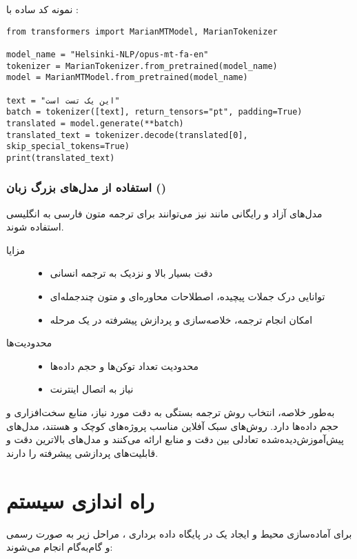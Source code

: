 \documentclass{article}
\begin{document}
نمونه کد ساده با :
\begin{latin}
\begin{lstlisting}
from transformers import MarianMTModel, MarianTokenizer

model_name = "Helsinki-NLP/opus-mt-fa-en"
tokenizer = MarianTokenizer.from_pretrained(model_name)
model = MarianMTModel.from_pretrained(model_name)

text = "این یک تست است"
batch = tokenizer([text], return_tensors="pt", padding=True)
translated = model.generate(**batch)
translated_text = tokenizer.decode(translated[0], skip_special_tokens=True)
print(translated_text)
\end{lstlisting}
\end{latin}

\subsubsection{استفاده از مدل‌های بزرگ زبان ()}
مدل‌های آزاد و رایگانی مانند  نیز می‌توانند برای ترجمه متون فارسی به انگلیسی استفاده شوند.

\begin{description}
\item[مزایا]
\begin{itemize}
\item دقت بسیار بالا و نزدیک به ترجمه انسانی
\item توانایی درک جملات پیچیده، اصطلاحات محاوره‌ای و متون چندجمله‌ای
\item امکان انجام ترجمه، خلاصه‌سازی و پردازش پیشرفته در یک مرحله
\end{itemize}
\item[محدودیت‌ها]
\begin{itemize}
\item محدودیت تعداد توکن‌ها و حجم داده‌ها
\item نیاز به اتصال اینترنت
\end{itemize}
\end{description}

به‌طور خلاصه، انتخاب روش ترجمه بستگی به دقت مورد نیاز، منابع سخت‌افزاری و حجم داده‌ها دارد.
روش‌های سبک آفلاین مناسب پروژه‌های کوچک و  هستند، مدل‌های پیش‌آموزش‌دیده‌شده تعادلی بین دقت و منابع ارائه می‌کنند و مدل‌های  بالاترین دقت و قابلیت‌های پردازشی پیشرفته را دارند.


\section{راه اندازی سیستم}
برای آماده‌سازی محیط و ایجاد یک  در پایگاه داده برداری ، مراحل زیر به صورت رسمی و گام‌به‌گام انجام می‌شوند:
\end{document}
